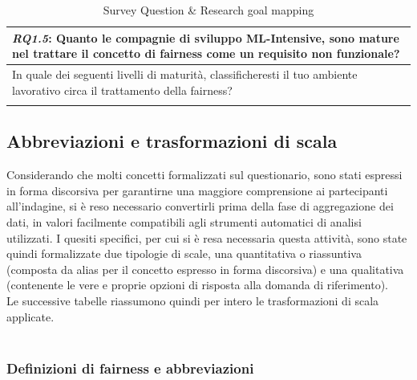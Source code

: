 \begin{longtable}{| p{} |}
        \\ \hline
        \rowcolor{Gray}
        \textbf{\textit{{RQ1.5}}}:  Quanto le compagnie di sviluppo ML-Intensive, sono mature nel trattare il concetto di fairness come un requisito non funzionale?\\
        
        \hline 
        In quale dei seguenti livelli di maturità, classificheresti il tuo ambiente lavorativo circa il trattamento della fairness?
        \\ \hline
        \caption{Survey Question \& Research goal mapping} %
    \label{tab:myfirstlongtable}
    \end{longtable}
    
    \subsection{Abbreviazioni e trasformazioni di scala}
    
    Considerando che molti concetti formalizzati sul questionario, sono stati espressi in forma discorsiva per garantirne una maggiore comprensione ai partecipanti all'indagine, si è reso necessario convertirli prima della fase di aggregazione dei dati, in valori facilmente compatibili agli strumenti automatici di analisi utilizzati. I quesiti specifici, per cui si è resa necessaria questa attività, sono state quindi formalizzate due tipologie di scale, una quantitativa o riassuntiva (composta da alias per il concetto espresso in forma discorsiva) e una qualitativa (contenente le vere e proprie opzioni di risposta alla domanda di riferimento).\\
    
    Le successive tabelle riassumono quindi per intero le trasformazioni di scala applicate.\\\\
    
    
    \subsubsection{Definizioni di fairness e abbreviazioni}
    
    \begin{center}
		\hspace*{-5mm}%
	\end{center}
	

